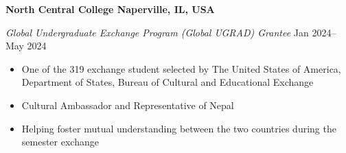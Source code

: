 \textbf{North Central College \hfill Naperville, IL, USA} \par
\textit{Global Undergraduate Exchange Program (Global UGRAD) Grantee} \hfill Jan 2024-- May 2024 \par
\begin{itemize}
	\item One of the 319 exchange student selected by The United States of America, Department of States, Bureau of Cultural and Educational Exchange
	\item Cultural Ambassador and Representative of Nepal
    \item Helping foster mutual understanding between the two countries during the semester exchange
\end{itemize}\par